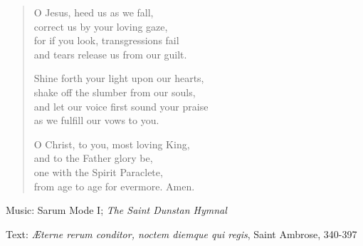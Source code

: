 \hymn



\setlength{\leftmargini}{2em}
\begin{verse}




O Jesus, heed us as we fall,\\
correct us by your loving gaze,\\
for if you look, transgressions fail\\
and tears release us from our guilt.

Shine forth your light upon our hearts,\\
shake off the slumber from our souls,\\
and let our voice first sound your praise\\
as we fulfill our vows to you.

O Christ, to you, most loving King,\\
and to the Father glory be,\\
one with the Spirit Paraclete,\\
from age to age for evermore. Amen.
\end{verse}
\setlength{\leftmargini}{\defleftmargini}

\begin{hymnsource}
Music: Sarum Mode I; \emph{The Saint Dunstan Hymnal}

Text: \emph{Æterne rerum conditor, noctem diemque qui regis}, Saint Ambrose, 340-397
\end{hymnsource}
